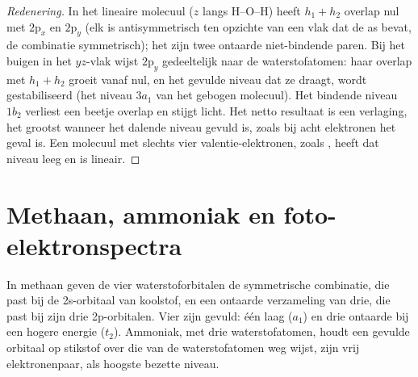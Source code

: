 \begin{proof}[Redenering]
In het lineaire molecuul ($z$ langs H--O--H) heeft $h_1 + h_2$ overlap nul met
$2\mathrm p_x$ en $2\mathrm p_y$ (elk is antisymmetrisch ten opzichte van een vlak dat
de as bevat, de combinatie symmetrisch); het zijn twee ontaarde
niet-bindende paren. Bij het buigen in het $yz$-vlak wijst $2\mathrm p_y$ gedeeltelijk naar
de waterstofatomen: haar overlap met $h_1 + h_2$ groeit vanaf nul, en het gevulde niveau
dat ze draagt, wordt gestabiliseerd (het niveau $3a_1$ van het gebogen molecuul). Het bindende
niveau $1b_2$ verliest een beetje overlap en stijgt licht. Het netto resultaat is een verlaging,
het grootst wanneer het dalende niveau gevuld is, zoals bij acht elektronen het geval is. Een
molecuul met slechts vier valentie-elektronen, zoals , heeft dat niveau
leeg en is lineair.
\end{proof}

\section{Methaan, ammoniak en foto-elektronspectra}

In methaan geven de vier waterstoforbitalen de symmetrische combinatie, die
past bij de 2s-orbitaal van koolstof, en een ontaarde verzameling van drie, die past bij
zijn drie 2p-orbitalen. Vier  zijn gevuld: één laag ($a_1$) en drie
ontaarde bij een hogere energie ($t_2$). Ammoniak, met drie waterstofatomen, houdt een
gevulde orbitaal op stikstof over die van de waterstofatomen weg wijst, zijn vrij elektronenpaar, als
hoogste bezette niveau.

